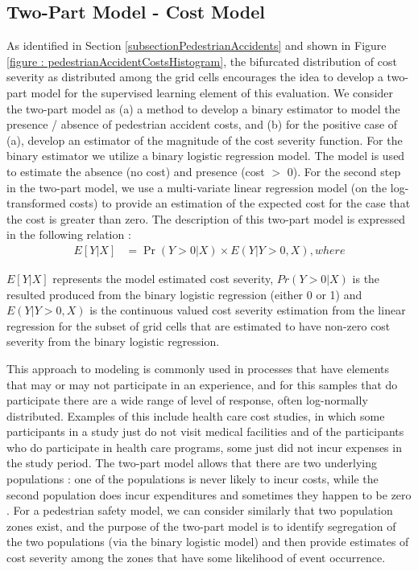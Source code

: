 \documentclass{llncs}
\begin{document}
\subsection{Two-Part Model - Cost Model}

As identified in Section \ref{subsectionPedestrianAccidents} and shown in Figure \ref{figure : pedestrianAccidentCostsHistogram}, the bifurcated distribution of cost severity as distributed among the grid cells encourages the idea to develop a two-part model for the supervised learning element of this evaluation. We consider the two-part model as (a) a method to develop a binary estimator to model the presence / absence of pedestrian accident costs, and (b) for the positive case of (a), develop an estimator of the magnitude of the cost severity function.
For the binary estimator we utilize a binary logistic regression model. The model is used to estimate the absence (no cost) and presence (cost $>$ 0). For the second step in the two-part model, we use a multi-variate linear regression model (on the log-transformed costs) to provide an estimation of the expected cost for the case that the cost is greater than zero. The description of this two-part model is expressed in the following relation : 
% 
\begin{align}
E[Y| X] &= \Pr(Y > 0 | X)\times E(Y | Y > 0,  X), where
\end{align}

$E{[Y|X]}$ represents the model estimated cost severity, $Pr(Y > 0 | X)$ is the resulted produced from the binary logistic regression (either 0 or 1) and $E(Y | Y > 0,  X)$ is the continuous valued cost severity estimation from the linear regression for the subset of grid cells that are estimated to have non-zero cost severity from the binary logistic regression.

This approach to modeling is commonly used in processes that have elements that may or may not participate in an experience, and for this samples that do participate there are a wide range of level of response, often log-normally distributed. Examples of this include health care cost studies, in which some participants in a study just do not visit medical facilities and of the participants who do participate in health care programs, some just did not incur expenses in the study period. The two-part model allows that there are two underlying populations : one of the populations is never likely to incur costs, while the second population does incur expenditures and sometimes they happen to be zero \cite{bun2004too}. For a pedestrian safety model, we can consider similarly that two population zones exist, and the purpose of the two-part model is to identify segregation of the two populations (via the binary logistic model) and then provide estimates of cost severity among the zones that have some likelihood of event occurrence.
\end{document}
